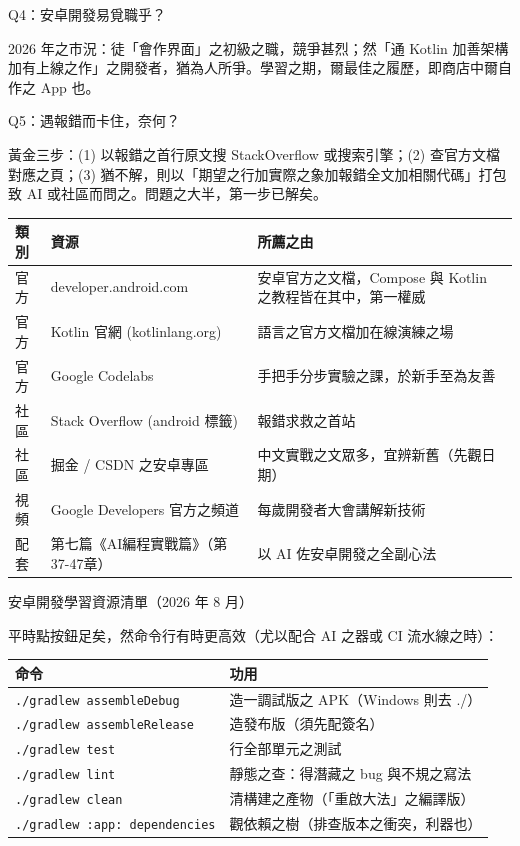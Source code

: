 Q4：安卓開發易覓職乎？

2026 年之市況：徒「會作界面」之初級之職，競爭甚烈；然「通 Kotlin 加善架構加有上線之作」之開發者，猶為人所爭。學習之期，爾最佳之履歷，即商店中爾自作之 App 也。

Q5：遇報錯而卡住，奈何？

黃金三步：(1) 以報錯之首行原文搜 StackOverflow 或搜索引擎；(2) 查官方文檔對應之頁；(3) 猶不解，則以「期望之行加實際之象加報錯全文加相關代碼」打包致 AI 或社區而問之。問題之大半，第一步已解矣。


\begin{center}
\begin{tabularx}{\linewidth}{|X|X|X|}
\hline
\textbf{類別} & \textbf{資源} & \textbf{所薦之由} \tabularnewline
\hline
官方 & developer.android.com & 安卓官方之文檔，Compose 與 Kotlin 之教程皆在其中，第一權威 \tabularnewline
官方 & Kotlin 官網 (kotlinlang.org) & 語言之官方文檔加在線演練之場 \tabularnewline
官方 & Google Codelabs & 手把手分步實驗之課，於新手至為友善 \tabularnewline
社區 & Stack Overflow (android 標籤) & 報錯求救之首站 \tabularnewline
社區 & 掘金 / CSDN 之安卓專區 & 中文實戰之文眾多，宜辨新舊（先觀日期） \tabularnewline
視頻 & Google Developers 官方之頻道 & 每歲開發者大會講解新技術 \tabularnewline
配套 & 第七篇《AI編程實戰篇》（第37-47章） & 以 AI 佐安卓開發之全副心法 \tabularnewline
\hline
\end{tabularx}
\end{center}

\begin{center}\small\color{gray}安卓開發學習資源清單（2026 年 8 月）\end{center}


平時點按鈕足矣，然命令行有時更高效（尤以配合 AI 之器或 CI 流水線之時）：

\begin{center}
\begin{tabularx}{\linewidth}{|X|X|}
\hline
\textbf{命令} & \textbf{功用} \tabularnewline
\hline
\texttt{.\allowbreak /\allowbreak gradlew assembleDebug} & 造一調試版之 APK（Windows 則去 ./） \tabularnewline
\texttt{.\allowbreak /\allowbreak gradlew assembleRelease} & 造發布版（須先配簽名） \tabularnewline
\texttt{.\allowbreak /\allowbreak gradlew test} & 行全部單元之測試 \tabularnewline
\texttt{.\allowbreak /\allowbreak gradlew lint} & 靜態之查：得潛藏之 bug 與不規之寫法 \tabularnewline
\texttt{.\allowbreak /\allowbreak gradlew clean} & 清構建之產物（「重啟大法」之編譯版） \tabularnewline
\texttt{.\allowbreak /\allowbreak gradlew :app: dependencies} & 觀依賴之樹（排查版本之衝突，利器也） \tabularnewline
\hline
\end{tabularx}
\end{center}

